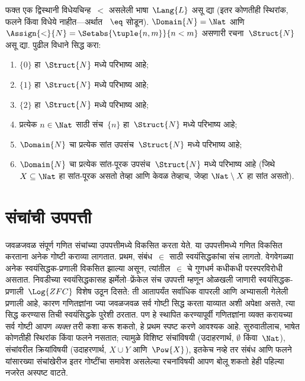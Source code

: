 \begin{prob}
फक्त एक द्विस्थानी विधेयचिन्ह~$<$ असलेली भाषा~$\Lang{L}$ असू द्या (इतर
कोणतीही स्थिरांक, फलने किंवा विधेये नाहीत---अर्थात
~$\eq$ सोडून). $\Domain{N} = \Nat$ आणि
$\Assign{<}{N} = \Setabs{\tuple{n,m}}{n < m}$ असणारी रचना~$\Struct{N}$
असू द्या. पुढील विधाने सिद्ध करा:
\begin{enumerate}
\item $\{ 0 \}$ हा~$\Struct{N}$ मध्ये परिभाष्य आहे;
\item $\{ 1 \}$ हा~$\Struct{N}$ मध्ये परिभाष्य आहे;
\item $\{ 2 \}$ हा~$\Struct{N}$ मध्ये परिभाष्य आहे;
\item प्रत्येक $n \in \Nat$ साठी संच~$\{ n \}$ हा~$\Struct{N}$ मध्ये
  परिभाष्य आहे;
\item $\Domain{N}$ चा प्रत्येक सांत उपसंच~$\Struct{N}$ मध्ये परिभाष्य आहे;
\item $\Domain{N}$ चा प्रत्येक सांत-पूरक उपसंच~$\Struct{N}$ मध्ये परिभाष्य
  आहे (जिथे $X \subseteq \Nat$ हा सांत-पूरक असतो तेव्हा आणि केवळ तेव्हाच,
  जेव्हा $\Nat \setminus X$ हा सांत असतो).
\end{enumerate}
\end{prob}












\section{संचांची उपपत्ती}\label{fol:mat:set:sec}

जवळजवळ संपूर्ण गणित संचांच्या उपपत्तीमध्ये विकसित करता येते. या
उपपत्तीमध्ये गणित विकसित करताना अनेक गोष्टी कराव्या लागतात. प्रथम,
संबंध~$\in$ साठी स्वयंसिद्धकांचा संच लागतो. वेगवेगळ्या अनेक
स्वयंसिद्धक-प्रणाली विकसित झाल्या असून, त्यांतील~$\in$ चे गुणधर्म कधीकधी
परस्परविरोधी असतात. निवडीच्या स्वयंसिद्धकासह झर्मेलो--फ्रेंकेल संच
उपपत्ती म्हणून ओळखली जाणारी स्वयंसिद्धक-प्रणाली~$\Log{ZFC}$ विशेष उठून
दिसते: ती आतापर्यंत सर्वाधिक वापरली आणि अभ्यासली गेलेली प्रणाली आहे, कारण
गणितज्ञांना ज्या जवळजवळ सर्व गोष्टी सिद्ध करता याव्यात अशी अपेक्षा असते,
त्या सिद्ध करण्यास तिची स्वयंसिद्धके पुरेशी ठरतात. पण हे स्थापित करण्यापूर्वी
गणितज्ञांना व्यक्त करायच्या सर्व गोष्टी आपण \emph{व्यक्त} तरी कशा करू शकतो,
हे प्रथम स्पष्ट करणे आवश्यक आहे. सुरुवातीलाच, भाषेत कोणतीही स्थिरांक
किंवा फलने नसतात; त्यामुळे विशिष्ट संचांविषयी (उदाहरणार्थ,
$\emptyset$ किंवा~$\Nat$), संचांवरील क्रियांविषयी (उदाहरणार्थ,
$X \cup Y$ आणि~$\Pow{X}$), इतकेच नव्हे तर संबंध आणि फलने यांसारख्या
संचांखेरीज इतर गोष्टींचा समावेश असलेल्या रचनांविषयी आपण बोलू शकतो हेही
पहिल्या नजरेत अस्पष्ट वाटते.

